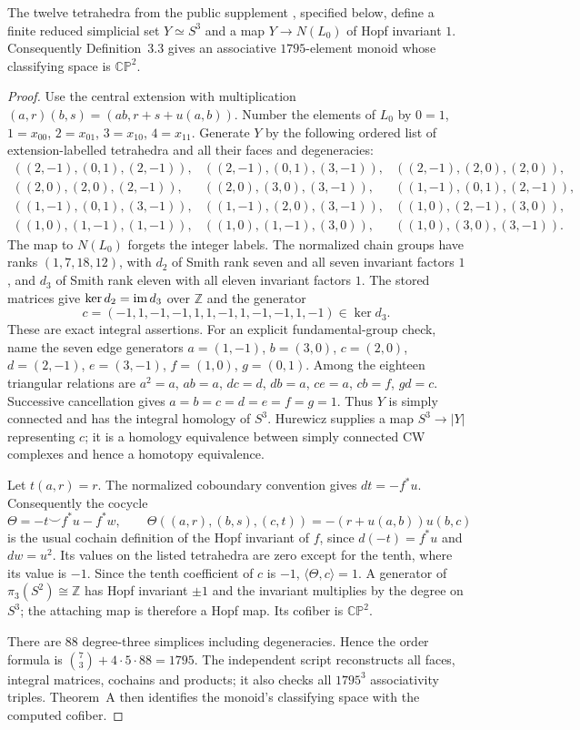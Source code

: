 \begin{proposition}\label{prop:B-CP1795}
The twelve tetrahedra from the public supplement
\cite{BenBassatSupplementB}, specified below, define a finite reduced simplicial
set $Y\simeq S^3$ and a map $Y\to N(L_0)$ of Hopf invariant $1$.
Consequently Definition~3.3 gives an associative $1795$-element monoid
whose classifying space is $\mathbb{CP}^2$.
\end{proposition}
\begin{proof}
Use the central extension with multiplication
$(a,r)(b,s)=(ab,r+s+u(a,b))$.  Number the elements of $L_0$ by
$0=1$, $1=x_{00}$, $2=x_{01}$, $3=x_{10}$, $4=x_{11}$.
Generate $Y$ by the following ordered list of extension-labelled
tetrahedra and all their faces and degeneracies:
\[
\begin{array}{lll}
((2,-1),(0,1),(2,-1)),&((2,-1),(0,1),(3,-1)),&((2,-1),(2,0),(2,0)),\\
((2,0),(2,0),(2,-1)),&((2,0),(3,0),(3,-1)),&((1,-1),(0,1),(2,-1)),\\
((1,-1),(0,1),(3,-1)),&((1,-1),(2,0),(3,-1)),&((1,0),(2,-1),(3,0)),\\
((1,0),(1,-1),(1,-1)),&((1,0),(1,-1),(3,0)),&((1,0),(3,0),(3,-1)).
\end{array}
\]
The map to $N(L_0)$ forgets the integer labels.  The normalized chain
groups have ranks $(1,7,18,12)$, with $d_2$ of Smith rank seven and
all seven invariant factors $1$, and $d_3$ of Smith rank eleven with
all eleven invariant factors $1$.  The stored matrices give
$\ker d_2=\operatorname{im} d_3$ over $\mathbb Z$ and the generator
\[
 c=(-1,1,-1,-1,1,1,-1,1,-1,-1,1,-1)\in\ker d_3.
\]
These are exact integral assertions.  For an explicit fundamental-group
check, name the seven edge generators
$a=(1,-1)$, $b=(3,0)$, $c=(2,0)$, $d=(2,-1)$,
$e=(3,-1)$, $f=(1,0)$, $g=(0,1)$.
Among the eighteen triangular relations are
$a^2=a$, $ab=a$, $dc=d$, $db=a$, $ce=a$, $cb=f$, $gd=c$.
Successive cancellation gives $a=b=c=d=e=f=g=1$.
Thus $Y$ is simply
connected and has the integral homology of $S^3$.  Hurewicz supplies
a map $S^3\to |Y|$ representing $c$; it is a homology equivalence
between simply connected CW complexes and hence a homotopy equivalence.

Let $t(a,r)=r$.  The normalized coboundary convention gives
$dt=-f^*u$.  Consequently the cocycle
\[
 \Theta=-t\smile f^*u-f^*w,
 \qquad
 \Theta((a,r),(b,s),(c,t))=-(r+u(a,b))u(b,c)
\]
is the usual cochain definition of the Hopf invariant of $f$, since
$d(-t)=f^*u$ and $dw=u^2$.  Its values on the listed tetrahedra
are zero except for the tenth, where its value is $-1$.
Since the tenth coefficient of $c$ is $-1$,
$\langle\Theta,c\rangle=1$.  A generator of
$\pi_3(S^2)\cong\mathbb Z$ has Hopf invariant $\pm1$ and the
invariant multiplies by the degree on $S^3$; the attaching map is
therefore a Hopf map.  Its cofiber is $\mathbb{CP}^2$.

There are $88$ degree-three simplices including degeneracies.  Hence
the order formula is $\binom73+4\cdot5\cdot88=1795$.
The independent script reconstructs all faces, integral matrices,
cochains and products; it also checks all $1795^3$ associativity
triples.  Theorem~A then identifies the monoid's classifying space
with the computed cofiber.
\end{proof}

